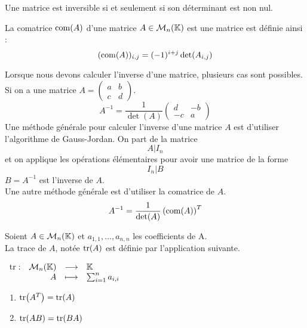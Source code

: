 \begin{proposition}
	Une matrice est inversible si et seulement si son déterminant est non nul.
\end{proposition}

\begin{definition}[Comatrice]
	La comatrice $\operatorname{com}(A)$ d'une matrice $A \in \mathcal{M}_n(\mathbb{K})$ est une matrice est définie ainsi :
	\[ (\operatorname{com}(A))_{i,j} = (-1)^{i+j} \det(A_{i,j}) \]
\end{definition}

Lorsque nous devons calculer l'inverse d'une matrice, plusieurs cas sont possibles.
    Si on a une matrice
    $A =
    \begin{pmatrix}
        a & b \\
        c & d
    \end{pmatrix}
    $.
    \[
    A^{-1} = \frac{1}{\det(A)} 
    \begin{pmatrix}
        d & -b \\
        -c & a
    \end{pmatrix}
    \]
    Une méthode générale pour calculer l'inverse d'une matrice $A$ est d'utiliser l'algorithme de Gauss-Jordan.
    On part de la matrice 
    \[ A|I_n \]
    et on applique les opérations élémentaires pour avoir une matrice de la forme
    \[I_n|B\]
    $B = A^{-1}$ est l'inverse de $A$.
    \\
    Une autre méthode générale est d'utiliser la comatrice de $A$.
    \[ A^{-1} = \frac{1}{\det(A)} \left( \operatorname{com}(A) \right)^T \]

\begin{definition}
	Soient $A \in \mathcal{M}_n(\mathbb{K})$ et $a_{1,1}, \ldots, a_{n,n}$ les coefficients de A. 
	\\
	La trace de $A$, notée $\tr(A)$ est définie par l'application suivante.
	\begin{center}
		$
		\begin{array}{rrcl} \tr : & \mathcal{M}_n(\mathbb{K}) & \longrightarrow & \mathbb{K} \\ & A & \longmapsto & \sum_{i=1}^n a_{i,i} \end{array}
		$
	\end{center}
\end{definition}

\begin{lemma}
	\begin{multicols}{2}
	    \begin{enumerate}
    		\item $\tr(A^T) = \tr(A)$
    		\item $\tr(A B) = \tr(B A)$
    	\end{enumerate}
	\end{multicols}
\end{lemma}

